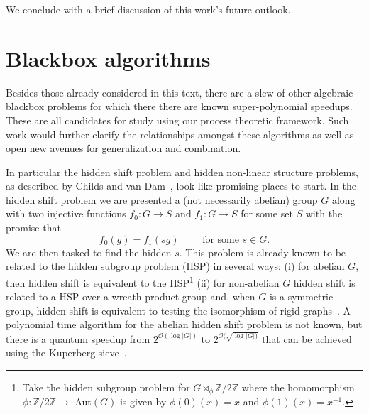 We conclude with a brief discussion of this work's future outlook.

\section{Blackbox algorithms}

Besides those already considered in this text, there are a slew of other algebraic blackbox problems for which there there are known super-polynomial speedups. These are all candidates for study using our process theoretic framework. Such work would further clarify the relationships amongst these algorithms as well as open new avenues for generalization and combination.

In particular the hidden shift problem and hidden non-linear structure problems, as described by Childs and van Dam~\cite{childs2010quantum}, look like promising places to start. In the hidden shift problem we are presented a (not necessarily abelian) group $G$ along with two injective functions $f_0:G\to S$ and $f_1:G\to S$ for some set $S$ with the promise that
\begin{equation}
f_0(g) = f_1(sg) \qquad \mbox{ for some }s\in G.
\end{equation}
We are then tasked to find the hidden $s$. This problem is already known to be related to the hidden subgroup problem (HSP) in several ways: (i) for abelian $G$, then hidden shift is equivalent to the HSP\footnote{Take the hidden subgroup problem for $G\rtimes_{\phi}\mathbb{Z}/2\mathbb{Z}$ where the homomorphism $\phi:\mathbb{Z}/2\mathbb{Z}\to$ Aut$(G)$ is given by $\phi(0)(x)= x$ and $\phi(1)(x)=x^{-1}$.} (ii) for non-abelian $G$ hidden shift is related to a HSP over a wreath product group and, when $G$ is a symmetric group, hidden shift is equivalent to testing the isomorphism of rigid graphs~\cite{childs2010quantum}. A polynomial time algorithm for the abelian hidden shift problem is not known, but there is a quantum speedup from $2^{\mathcal{O}(\log |G|)}$ to $2^{\mathcal{O}(\sqrt{\log |G|)}}$ that can be achieved using the Kuperberg sieve~\cite{childs2010quantum,kuperberg2005subexponential}.

